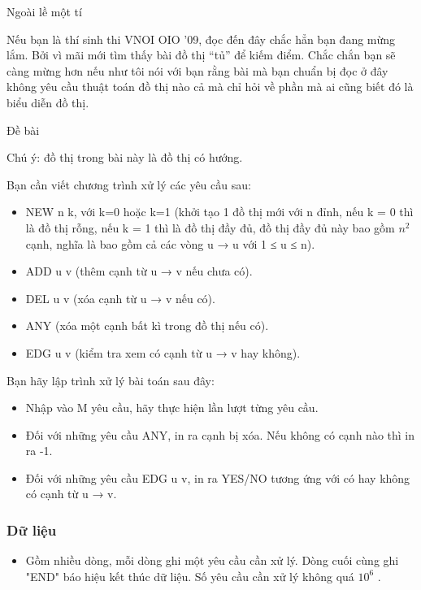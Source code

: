 



       Ngoài lề một tí     

   Nếu bạn là thí sinh thi VNOI OIO '09, đọc đến đây chắc hẳn bạn đang mừng lắm. Bởi vì mãi mới tìm thấy bài đồ thị “tủ” để kiếm điểm. Chắc chắn bạn sẽ càng mừng hơn nếu như tôi nói với bạn rằng bài mà bạn chuẩn bị đọc ở đây không yêu cầu thuật toán đồ thị nào cả mà chỉ hỏi về phần mà ai cũng biết đó là biểu diễn đồ thị.  

       Đề bài     

   Chú ý: đồ thị trong bài này là đồ thị có hướng.  

   Bạn cần viết chương trình xử lý các yêu cầu sau:  
\begin{itemize}
	\item     NEW n k, với k=0 hoặc k=1 (khởi tạo 1 đồ thị mới với n đỉnh, nếu k = 0 thì là đồ thị rỗng, nếu k = 1 thì là đồ thị đầy đủ, đồ thị đầy đủ này bao gồm $n^{2}$    cạnh, nghĩa là bao gồm cả các vòng u → u với 1 ≤ u ≤ n).   
	\item     ADD u v (thêm cạnh từ u → v nếu chưa có).   
	\item     DEL u v (xóa cạnh từ u → v nếu có).   
	\item     ANY (xóa một cạnh bất kì trong đồ thị nếu có).   
	\item     EDG u v (kiểm tra xem có cạnh từ u → v hay không).   
\end{itemize}

   Bạn hãy lập trình xử lý bài toán sau đây:  
\begin{itemize}
	\item     Nhập vào M yêu cầu, hãy thực hiện lần lượt từng yêu cầu.   
	\item     Đối với những yêu cầu ANY, in ra cạnh bị xóa. Nếu không có cạnh nào thì in ra -1.   
	\item     Đối với những yêu cầu EDG u v, in ra YES/NO tương ứng với có hay không có cạnh từ u → v.   
\end{itemize}

\subsubsection{   Dữ liệu  }
\begin{itemize}
	\item     Gồm nhiều dòng, mỗi dòng ghi một yêu cầu cần xử lý. Dòng cuối cùng ghi "END" báo hiệu kết thúc dữ liệu. Số yêu cầu cần xử lý không quá $10^{6}$    .   
\end{itemize}

